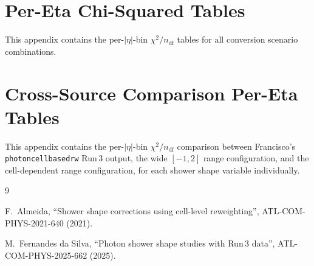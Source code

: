 \documentclass[11pt,a4paper]{article}
\newcommand{\abseta}{\ensuremath{|\eta|}}
\newcommand{\chisq}{\ensuremath{\chi^2 / n_{\mathrm{df}}}}
\begin{document}
\appendix
\section{Per-Eta Chi-Squared Tables}
\label{app:chi2-tables}

This appendix contains the per-$\abseta$-bin $\chisq$ tables for all
conversion scenario combinations.



\section{Cross-Source Comparison Per-Eta Tables}
\label{app:comparison-tables}

This appendix contains the per-$\abseta$-bin $\chisq$ comparison
between Francisco's \texttt{photoncellbasedrw} Run\,3 output, the
wide $[-1,2]$ range configuration, and the cell-dependent range
configuration, for each shower shape variable individually.




\begin{thebibliography}{9}

  F.~Almeida,
  ``Shower shape corrections using cell-level reweighting'',
  ATL-COM-PHYS-2021-640 (2021).

  M.~Fernandes da Silva,
  ``Photon shower shape studies with Run\,3 data'',
  ATL-COM-PHYS-2025-662 (2025).

\end{thebibliography}
\end{document}
